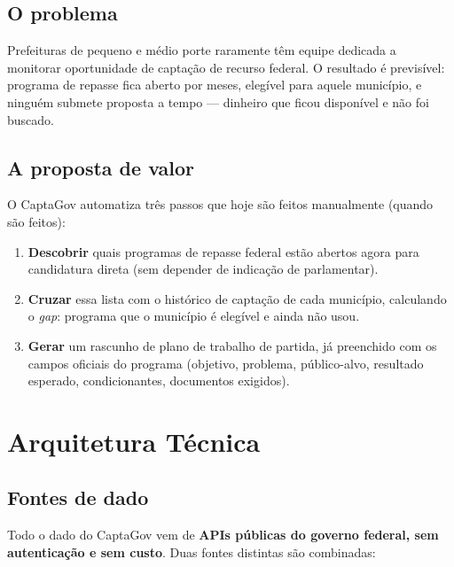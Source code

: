 \documentclass[11pt,a4paper]{article}
\begin{document}
\subsection{O problema}

Prefeituras de pequeno e médio porte raramente têm equipe dedicada a monitorar oportunidade
de captação de recurso federal. O resultado é previsível: programa de repasse fica aberto por
meses, elegível para aquele município, e ninguém submete proposta a tempo --- dinheiro que
ficou disponível e não foi buscado.

\subsection{A proposta de valor}

O CaptaGov automatiza três passos que hoje são feitos manualmente (quando são feitos):

\begin{enumerate}
  \item \textbf{Descobrir} quais programas de repasse federal estão abertos agora para
    candidatura direta (sem depender de indicação de parlamentar).
  \item \textbf{Cruzar} essa lista com o histórico de captação de cada município, calculando
    o \emph{gap}: programa que o município é elegível e ainda não usou.
  \item \textbf{Gerar} um rascunho de plano de trabalho de partida, já preenchido com os
    campos oficiais do programa (objetivo, problema, público-alvo, resultado esperado,
    condicionantes, documentos exigidos).
\end{enumerate}

\section{Arquitetura Técnica}

\subsection{Fontes de dado}

Todo o dado do CaptaGov vem de \textbf{APIs públicas do governo federal, sem autenticação e
sem custo}. Duas fontes distintas são combinadas:
\end{document}
